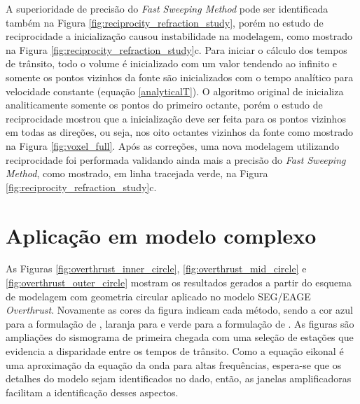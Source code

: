 A superioridade de precisão do \textit{Fast Sweeping Method} pode ser identificada também na Figura \ref{fig:reciprocity_refraction_study}, porém no estudo de reciprocidade a inicialização causou instabilidade na modelagem, como mostrado na Figura \ref{fig:reciprocity_refraction_study}c. Para iniciar o cálculo dos tempos de trânsito, todo o volume é inicializado com um valor tendendo ao infinito e somente os pontos vizinhos da fonte são inicializados com o tempo analítico para velocidade constante (equação \ref{analyticalT}). O algoritmo original de  inicializa analiticamente somente os pontos do primeiro octante, porém o estudo de reciprocidade mostrou que a inicialização deve ser feita para os pontos vizinhos em todas as direções, ou seja,  nos oito octantes vizinhos da fonte como mostrado na Figura \ref{fig:voxel_full}. Após as correções, uma nova modelagem utilizando reciprocidade foi performada validando ainda mais a precisão do \textit{Fast Sweeping Method}, como mostrado, em linha tracejada verde, na Figura \ref{fig:reciprocity_refraction_study}c.


\section{Aplicação em modelo complexo}

As Figuras \ref{fig:overthrust_inner_circle}, \ref{fig:overthrust_mid_circle} e \ref{fig:overthrust_outer_circle} mostram os resultados gerados a partir do esquema de modelagem com geometria circular aplicado no modelo SEG/EAGE \textit{Overthrust}. Novamente as cores da figura indicam cada método, sendo a cor azul para a formulação de , laranja para  e verde para a formulação de . As figuras são ampliações do sismograma de primeira chegada com uma seleção de estações que evidencia a disparidade entre os tempos de trânsito. Como a equação eikonal é uma aproximação da equação da onda para altas frequências, espera-se que os detalhes do modelo sejam identificados no dado, então, as janelas amplificadoras facilitam a identificação desses aspectos.    

